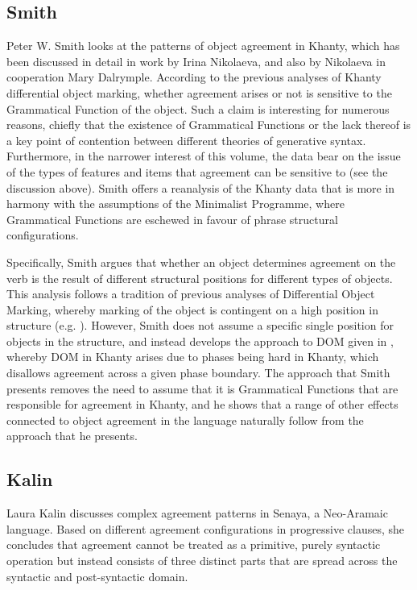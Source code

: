 \documentclass[output=paper
,modfonts
,nonflat]{langsci/langscibook}
\begin{document}
\subsection{Smith}
\label{sec:smith}

Peter W. Smith looks at the patterns of object agreement in Khanty, which has been discussed in detail in work by Irina Nikolaeva, and also by Nikolaeva in cooperation Mary Dalrymple.
According to the previous analyses of Khanty differential object marking, whether agreement arises or not is sensitive to the Grammatical Function of the object.
Such a claim is interesting for numerous reasons, chiefly that the existence of Grammatical Functions or the lack thereof is a key point of contention between different theories of generative syntax.
Furthermore, in the narrower interest of this volume, the data bear on the issue of the types of features and items that agreement can be sensitive to (see the discussion above).
Smith offers a reanalysis of the Khanty data that is more in harmony with the assumptions of the Minimalist Programme, where Grammatical Functions are eschewed in favour of phrase structural configurations.

Specifically, Smith argues that whether an object determines agreement on the verb is the result of different structural positions for different types of objects.
This analysis follows a tradition of previous analyses of Differential Object Marking, whereby marking of the object is contingent on a high position in structure (e.g. \citealt{bakervinokurova2010,woolford2001}).
However, Smith does not assume a specific single position for objects in the structure, and instead develops the approach to DOM given in \citet{Baker2015}, whereby DOM in Khanty arises due to phases being hard in Khanty, which disallows agreement across a given phase boundary.
The approach that Smith presents removes the need to assume that it is Grammatical Functions that are responsible for agreement in Khanty, and he shows that a range of other effects connected to object agreement in the language naturally follow from the approach that he presents.

\subsection{Kalin}
\label{sec:kalin}

Laura Kalin discusses complex agreement patterns in Senaya, a Neo-Aramaic language. Based on different agreement configurations in progressive clauses, she concludes that agreement cannot be treated as a primitive, purely syntactic operation but instead consists of three distinct parts that are spread across the syntactic and post-syntactic domain.
\end{document}
